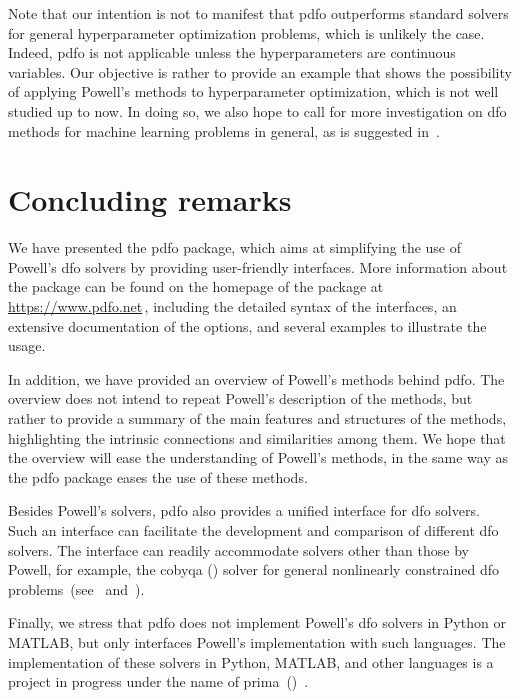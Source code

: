 \documentclass[
    smallextended,  %
    draft,          %
    final,          %
]{svjour3}
\begin{document}
Note that our intention is not to manifest that \gls{pdfo} outperforms standard solvers for
general hyperparameter optimization problems, which is unlikely the case.
Indeed, \gls{pdfo} is not
applicable unless the hyperparameters are continuous variables.
Our objective is rather to provide an
example that shows the possibility of applying Powell's methods to hyperparameter optimization, which is not well studied up to now.
In doing so, we also hope to call for more investigation on \gls{dfo} methods for
machine learning problems in general, as is suggested in~\cite{Ghanbari_Scheinberg_2017}.




\section{Concluding remarks}
\label{sec:conclude}

We have presented the \gls{pdfo} package, which aims at simplifying the use of
Powell's \gls{dfo} solvers by providing user-friendly interfaces.
More information about the package can be found on the homepage of the package at
\mbox{\url{https://www.pdfo.net}}\,, including the detailed syntax of the interfaces,
an extensive documentation of the options, and several examples to illustrate the usage.

In addition, we have provided an overview of Powell's methods behind \gls{pdfo}.
The overview does not intend to repeat Powell's description of the methods, but rather to provide a
summary of the main features and structures of the methods, highlighting the intrinsic connections and
similarities among them.
We hope that the overview will ease the understanding of Powell's methods,
in the same way as the \gls{pdfo} package eases the use of these methods.

Besides Powell's solvers, \gls{pdfo} also provides a unified interface for \gls{dfo} solvers.
Such an interface can facilitate the development and comparison of different \gls{dfo} solvers.
The interface can readily accommodate solvers other than those by Powell, for example,
the \gls{cobyqa} () solver for general nonlinearly
constrained \gls{dfo} problems~(see~\cite[Chapters 5--7]{Ragonneau_2022}
and~\cite{Ragonneau_Zhang_cobyqa}).

Finally, we stress that \gls{pdfo} does not implement Powell's \gls{dfo} solvers in Python
or MATLAB, but only interfaces Powell's implementation with such languages.
The implementation of
these solvers in Python, \mbox{MATLAB}, and other languages is a project in progress under the name of
\gls{prima}~()~\cite{Zhang_prima}.
\end{document}

